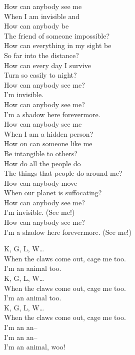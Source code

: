 


How can anybody see me \\
When I am invisible and \\
How can anybody be \\
The friend of someone impossible? \\
How can everything in my sight be \\
So far into the distance? \\
How can every day I survive \\
Turn so easily to night? \\

How can anybody see me? \\
I'm invisible. \\
How can anybody see me? \\
I'm a shadow here forevermore. \\

How can anybody see me \\
When I am a hidden person? \\
How on  can someone like me \\
Be intangible to others? \\
How do all the people do \\
The things that people do around me? \\
How can anybody move \\
When our planet is suffocating? \\

How can anybody see me? \\
I'm invisible. (See me!) \\
How can anybody see me? \\
I'm a shadow here forevermore. (See me!) \\




K, G, L, W… \\

When the claws come out, cage me too. \\
I'm an animal too. \\

K, G, L, W… \\

When the claws come out, cage me too. \\
I'm an animal too. \\

K, G, L, W… \\

When the claws come out, cage me too. \\
I'm an an-- \\
I'm an an-- \\
I'm an animal, woo! \\
